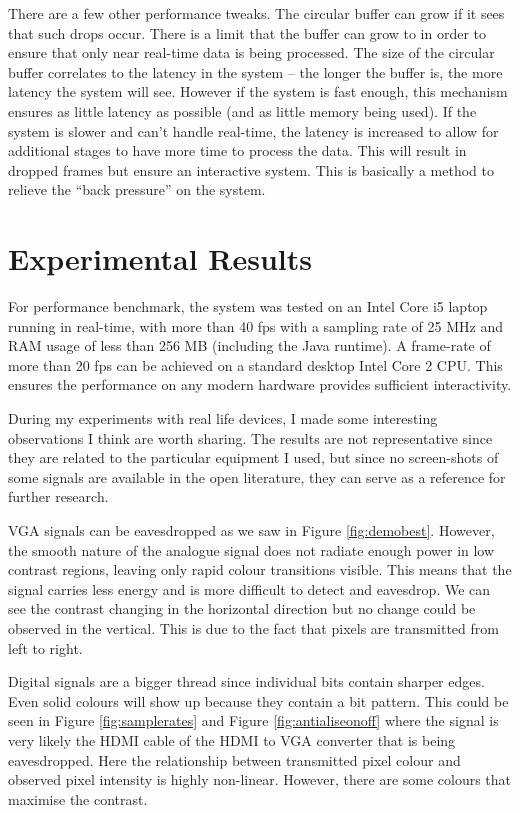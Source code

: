 \documentclass[a4paper,12pt,twoside,openright]{report}
\begin{document}
There are a few other performance tweaks. The circular buffer can grow if it sees that such drops occur. There is a limit that the buffer can grow to in order to ensure that only near real-time data is being processed. The size of the circular buffer correlates to the latency in the system -- the longer the buffer is, the more latency the system will see. However if the system is fast enough, this mechanism ensures as little latency as possible (and as little memory being used). If the system is slower and can't handle real-time, the latency is increased to allow for additional stages to have more time to process the data. This will result in dropped frames but ensure an interactive system. This is basically a method to relieve the ``back pressure'' on the system. 

\section{Experimental Results}

For performance benchmark, the system was tested on an Intel Core i5 laptop running in real-time, with more than 40 fps with a sampling rate of 25 MHz and RAM usage of less than 256 MB (including the Java runtime). A frame-rate of more than 20 fps can be achieved on a standard desktop Intel Core 2 CPU. This ensures the performance on any modern hardware provides sufficient interactivity.

During my experiments with real life devices, I made some interesting observations I think are worth sharing. The results are not representative since they are related to the particular equipment I used, but since no screen-shots of some signals are available in the open literature, they can serve as a reference for further research.

VGA signals can be eavesdropped as we saw in Figure \ref{fig:demobest}. However, the smooth nature of the analogue signal does not radiate enough power in low contrast regions, leaving only rapid colour transitions visible. This means that the signal carries less energy and is more difficult to detect and eavesdrop. We can see the contrast changing in the horizontal direction but no change could be observed in the vertical. This is due to the fact that pixels are transmitted from left to right.

Digital signals are a bigger thread since individual bits contain sharper edges. Even solid colours will show up because they contain a bit pattern. This could be seen in Figure \ref{fig:samplerates} and Figure \ref{fig:antialiseonoff}  where the signal is very likely the HDMI cable of the HDMI to VGA converter that is being eavesdropped. Here the relationship between transmitted pixel colour and observed pixel intensity is highly non-linear. However, there are some colours that maximise the contrast.
\end{document}

